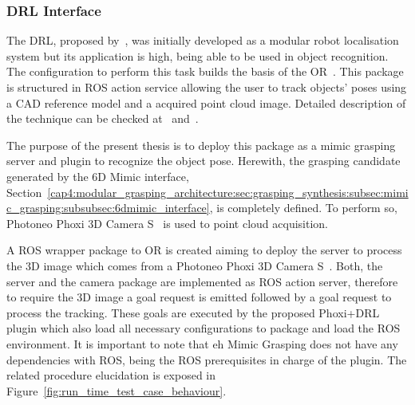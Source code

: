\subsubsection{\acl{DRL} Interface}
\label{cap4:modular_grasping_architecture:sec:grasping_synthesis:subsec:mimic_grasping:subsubsec:drl_interface}

The \ac{DRL}, proposed by~\cite{COSTA2016113}, was initially developed as a modular robot localisation system but its application is high, being able to be used in object recognition. The configuration to perform this task builds the basis of the \ac{OR}~\cite{or}. This package is structured in \ac{ROS} action service allowing the user to track objects' poses using a CAD reference model and a acquired point cloud image. Detailed description of the technique can be checked at~\cite{COSTA2016113} and~\cite{or}.

The purpose of the present thesis is to deploy this package as a mimic grasping server and plugin to recognize the object pose. Herewith, the grasping candidate generated by the 6D Mimic interface, Section~\ref{cap4:modular_grasping_architecture:sec:grasping_synthesis:subsec:mimic_grasping:subsubsec:6dmimic_interface}, is completely defined. To perform so, Photoneo Phoxi 3D Camera S~\cite{photoneo} is used to point cloud acquisition.


A \ac{ROS} wrapper package to \ac{OR} is created aiming to deploy the server to process the 3D image which comes from a Photoneo Phoxi 3D Camera S~\cite{photoneo}. Both, the server and the camera package are implemented as \ac{ROS} action server, therefore to require the 3D image a goal request is emitted followed by a goal request to process the tracking. These goals are executed by the proposed Phoxi+\ac{DRL} plugin which also load all necessary configurations to package and load the \ac{ROS} environment. It is important to note that eh Mimic Grasping does not have any dependencies with ROS, being the \ac{ROS} prerequisites in charge of the plugin. The related procedure elucidation is exposed in Figure~\ref{fig:run_time_test_case_behaviour}.


